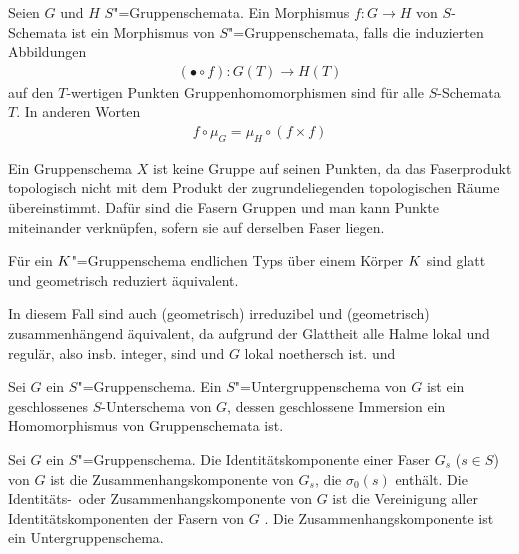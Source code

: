 \documentclass[german]{scrreprt}
\begin{document}
\begin{Definition}[$S$"=Gruppenschema]
\begin{Definition}
  Seien $G$ und $H$ $S$"=Gruppenschemata.
  Ein Morphismus $f\colon G\to H$ von $S$-Schemata ist ein Morphismus
  von $S$"=Gruppenschemata, falls die induzierten Abbildungen
  \begin{gather*}
  (\bullet\circ f)\colon G(T)\to H(T)
  \end{gather*}auf den $T$-wertigen Punkten
  Gruppenhomomorphismen sind für alle $S$-Schemata $T$.
  In anderen Worten
  \begin{gather*}
    f\circ\mu_G = \mu_H\circ(f\times f)
  \end{gather*}
  \cite[Definition 4.42]{wedhorn}
\end{Definition}

\begin{Bemerkung}
  Ein Gruppenschema $X$ ist keine Gruppe auf seinen Punkten, da das
  Faserprodukt topologisch nicht mit dem Produkt der zugrundeliegenden
  topologischen Räume übereinstimmt.
  Dafür sind die Fasern Gruppen und man kann Punkte miteinander
  verknüpfen, sofern sie auf derselben Faser liegen.
\end{Bemerkung}

\begin{Bemerkung}\label{gruppenschemaaequivalenzen}
  Für ein $K$"=Gruppenschema endlichen Typs über einem Körper $K$
  sind glatt und geometrisch reduziert äquivalent.
  \cite[8.5, Excercise 11]{bosch}
  
  In diesem Fall sind auch (geometrisch) irreduzibel und (geometrisch)
  zusammenhängend äquivalent, da aufgrund der Glattheit alle Halme
  lokal und regulär, also insb. integer, sind und $G$ lokal noethersch
  ist.
  \cite[s.][Exercise 3.16]{wedhorn} und \cite[Corollary 16.51]{wedhorn}
\end{Bemerkung}
\end{Definition}

\begin{Definition}[Untergruppenschema]
  Sei $G$ ein $S$"=Gruppenschema.
  Ein $S$"=Untergruppenschema von $G$ ist ein geschlossenes
  $S$-Unterschema von $G$, dessen geschlossene Immersion ein
  Homomorphismus von Gruppenschemata ist.
  \cite[vgl.][Definition 4.45]{wedhorn}
\end{Definition}

\begin{Definition}[Identitätskomponente]
  Sei $G$ ein $S$"=Gruppenschema.
  Die Identitätskomponente einer Faser $G_s$ ($s\in S$) von $G$ ist
  die Zusammenhangskomponente von $G_s$, die $\sigma_0(s)$ enthält.
  Die Identitäts-~oder Zusammenhangskomponente von $G$ ist
  die Vereinigung aller Identitätskomponenten der Fasern von $G$
  \cite[Remark IV.6.1.2]{silverman2}.
  Die Zusammenhangskomponente ist ein Untergruppenschema.
\end{Definition}
\end{document}
